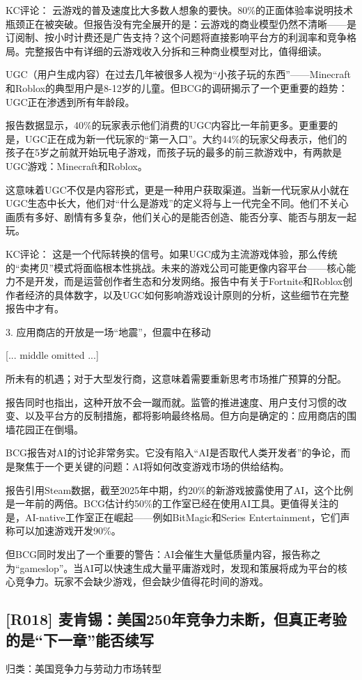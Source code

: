 \documentclass[11pt]{ctexart}
\begin{document}
KC评论： 云游戏的普及速度比大多数人想象的要快。80\%的正面体验率说明技术瓶颈正在被突破。但报告没有完全展开的是：云游戏的商业模型仍然不清晰——是订阅制、按小时计费还是广告支持？这个问题将直接影响平台方的利润率和竞争格局。完整报告中有详细的云游戏收入分拆和三种商业模型对比，值得细读。

UGC（用户生成内容）在过去几年被很多人视为“小孩子玩的东西”——Minecraft和Roblox的典型用户是8-12岁的儿童。但BCG的调研揭示了一个更重要的趋势：UGC正在渗透到所有年龄段。

报告数据显示，40\%的玩家表示他们消费的UGC内容比一年前更多。更重要的是，UGC正在成为新一代玩家的“第一入口”。大约44\%的玩家父母表示，他们的孩子在5岁之前就开始玩电子游戏，而孩子玩的最多的前三款游戏中，有两款是UGC游戏：Minecraft和Roblox。

这意味着UGC不仅是内容形式，更是一种用户获取渠道。当新一代玩家从小就在UGC生态中长大，他们对“什么是游戏”的定义将与上一代完全不同。他们不关心画质有多好、剧情有多复杂，他们关心的是能否创造、能否分享、能否与朋友一起玩。

KC评论： 这是一个代际转换的信号。如果UGC成为主流游戏体验，那么传统的“卖拷贝”模式将面临根本性挑战。未来的游戏公司可能更像内容平台——核心能力不是开发，而是运营创作者生态和分发网络。报告中有关于Fortnite和Roblox创作者经济的具体数字，以及UGC如何影响游戏设计原则的分析，这些细节在完整报告中才有。

3. 应用商店的开放是一场“地震”，但震中在移动

[... middle omitted ...]

所未有的机遇；对于大型发行商，这意味着需要重新思考市场推广预算的分配。

报告同时也指出，这种开放不会一蹴而就。监管的推进速度、用户支付习惯的改变、以及平台方的反制措施，都将影响最终格局。但方向是确定的：应用商店的围墙花园正在倒塌。

BCG报告对AI的讨论非常务实。它没有陷入“AI是否取代人类开发者”的争论，而是聚焦于一个更关键的问题：AI将如何改变游戏市场的供给结构。

报告引用Steam数据，截至2025年中期，约20\%的新游戏披露使用了AI，这个比例是一年前的两倍。BCG估计约50\%的工作室已经在使用AI工具。更值得关注的是，AI-native工作室正在崛起——例如BitMagic和Series Entertainment，它们声称可以加速游戏开发90\%。

但BCG同时发出了一个重要的警告：AI会催生大量低质量内容，报告称之为“gameslop”。当AI可以快速生成大量平庸游戏时，发现和策展将成为平台的核心竞争力。玩家不会缺少游戏，但会缺少值得花时间的游戏。

\subsection{[R018] 麦肯锡：美国250年竞争力未断，但真正考验的是“下一章”能否续写}
{\small\color{refgray}归类：美国竞争力与劳动力市场转型}
\end{document}

